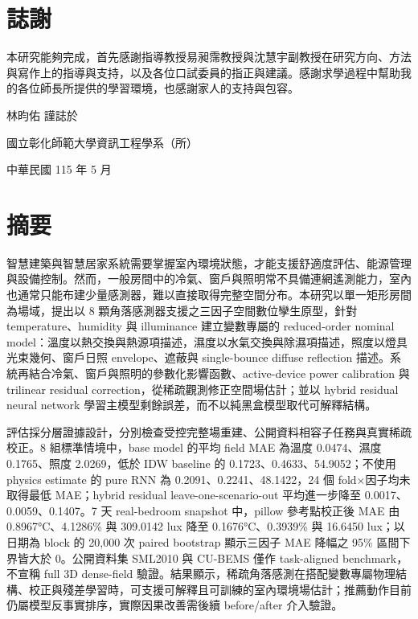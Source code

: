 \documentclass[12pt,a4paper]{article}
\begin{document}
\section*{誌謝}

本研究能夠完成，首先感謝指導教授易昶霈教授與沈慧宇副教授在研究方向、方法與寫作上的指導與支持，以及各位口試委員的指正與建議。感謝求學過程中幫助我的各位師長所提供的學習環境，也感謝家人的支持與包容。


林昀佑 謹誌於


國立彰化師範大學資訊工程學系（所）


中華民國 115 年 5 月


\clearpage

\section*{摘要}

智慧建築與智慧居家系統需要掌握室內環境狀態，才能支援舒適度評估、能源管理與設備控制。然而，一般房間中的冷氣、窗戶與照明常不具備連網遙測能力，室內也通常只能布建少量感測器，難以直接取得完整空間分布。本研究以單一矩形房間為場域，提出以 8 顆角落感測器支援之三因子空間數位孿生原型，針對 temperature、humidity 與 illuminance 建立變數專屬的 reduced-order nominal model：溫度以熱交換與熱源項描述，濕度以水氣交換與除濕項描述，照度以燈具光束幾何、窗戶日照 envelope、遮蔽與 single-bounce diffuse reflection 描述。系統再結合冷氣、窗戶與照明的參數化影響函數、active-device power calibration 與 trilinear residual correction，從稀疏觀測修正空間場估計；並以 hybrid residual neural network 學習主模型剩餘誤差，而不以純黑盒模型取代可解釋結構。


評估採分層證據設計，分別檢查受控完整場重建、公開資料相容子任務與真實稀疏校正。8 組標準情境中，base model 的平均 field MAE 為溫度 0.0474、濕度 0.1765、照度 2.0269，低於 IDW baseline 的 0.1723、0.4633、54.9052；不使用 physics estimate 的 pure RNN 為 0.2091、0.2241、48.1422，24 個 fold×因子均未取得最低 MAE；hybrid residual leave-one-scenario-out 平均進一步降至 0.0017、0.0059、0.1407。7 天 real-bedroom snapshot 中，pillow 參考點校正後 MAE 由 0.8967°C、4.1286\% 與 309.0142 lux 降至 0.1676°C、0.3939\% 與 16.6450 lux；以日期為 block 的 20,000 次 paired bootstrap 顯示三因子 MAE 降幅之 95\% 區間下界皆大於 0。公開資料集 SML2010 與 CU-BEMS 僅作 task-aligned benchmark，不宣稱 full 3D dense-field 驗證。結果顯示，稀疏角落感測在搭配變數專屬物理結構、校正與殘差學習時，可支援可解釋且可訓練的室內環境場估計；推薦動作目前仍屬模型反事實排序，實際因果改善需後續 before/after 介入驗證。
\end{document}
